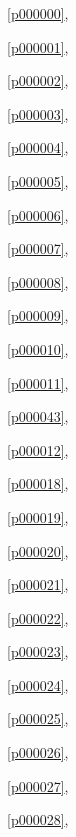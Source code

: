 ﻿



\noindent\figurename\ \ref{p000000},\ \pageref{p000000}

\noindent\figurename\ \ref{p000001},\ \pageref{p000001}

\noindent\figurename\ \ref{p000002},\ \pageref{p000002}

\noindent\figurename\ \ref{p000003},\ \pageref{p000003}

\noindent\figurename\ \ref{p000004},\ \pageref{p000004}

\noindent\figurename\ \ref{p000005},\ \pageref{p000005}

\noindent\figurename\ \ref{p000006},\ \pageref{p000006}

\noindent\figurename\ \ref{p000007},\ \pageref{p000007}

\noindent\figurename\ \ref{p000008},\ \pageref{p000008}

\noindent\figurename\ \ref{p000009},\ \pageref{p000009}

\noindent\figurename\ \ref{p000010},\ \pageref{p000010}

\noindent\figurename\ \ref{p000011},\ \pageref{p000011}

\noindent\figurename\ \ref{p000043},\ \pageref{p000043}

\noindent\figurename\ \ref{p000012},\ \pageref{p000012}

\noindent\figurename\ \ref{p000018},\ \pageref{p000018}

\noindent\figurename\ \ref{p000019},\ \pageref{p000019}

\noindent\figurename\ \ref{p000020},\ \pageref{p000020}

\noindent\figurename\ \ref{p000021},\ \pageref{p000021}

\noindent\figurename\ \ref{p000022},\ \pageref{p000022}

\noindent\figurename\ \ref{p000023},\ \pageref{p000023}

\noindent\figurename\ \ref{p000024},\ \pageref{p000024}

\noindent\figurename\ \ref{p000025},\ \pageref{p000025}

\noindent\figurename\ \ref{p000026},\ \pageref{p000026}

\noindent\figurename\ \ref{p000027},\ \pageref{p000027}

\noindent\figurename\ \ref{p000028},\ \pageref{p000028}

